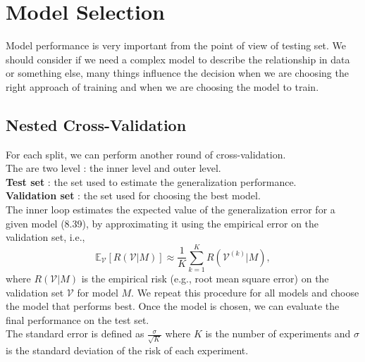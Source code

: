 \section{Model Selection}
Model performance is very important from the point of view of testing set. We should consider if we need a complex model to describe the relationship in data or something else, many things influence the decision when we are choosing the right approach of training and when we are choosing the model to train.\\
\subsection{Nested Cross-Validation}
For each split, we can perform another round of cross-validation. \\
The are two level : the inner level and outer level. \\
\textbf{Test set} : the set used to estimate the generalization performance.\\
\textbf{Validation set} : the set used for choosing the best model. \\ 
The inner loop estimates the expected value of the generalization error for a given model
(8.39), by approximating it using the empirical error on the validation set, i.e., 
\[
\mathbb{E}_{\mathcal{V}}[ R(\mathcal{V}|M)] \approx \frac{1}{K} \sum_{k=1}^{K} R(\mathcal{V}^{(k)} | M), \tag{8.36}
\]
where $R(\mathcal{V} | M)$ is the empirical risk (e.g., root mean square error) on the
validation set $\mathcal{V}$ for model $M$. We repeat this procedure for all models and choose the model that performs best. Once the model is chosen, we can evaluate the final performance on the test set.\\
The standard error is defined as $\frac{\sigma}{\sqrt{K}}$ where $K$ is the number of experiments and $\sigma$ is the standard deviation of the risk of each experiment. \\ 

